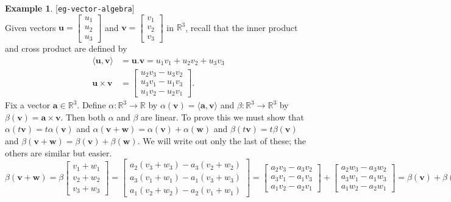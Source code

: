 \documentclass{amsart}
\newcommand{\lbl}[1]{\label{#1}\textup{[\texttt{#1}]}\ \\}
\newcommand{\lbl}{\label}
\newcommand{\R}         {{\mathbb{R}}}
\newcommand{\bsm}       {\left[\begin{smallmatrix}}
\newcommand{\esm}       {\end{smallmatrix}\right]}
\newcommand{\al}        {\alpha}
\newcommand{\bt}        {\beta}
\newcommand{\tm}        {\times}
\newcommand{\xra}       {\xrightarrow}
\newcommand{\ip}[1]     {\langle #1\rangle}
\newcommand{\va}        {\mathbf{a}}
\newcommand{\vu}        {\mathbf{u}}
\newcommand{\vv}        {\mathbf{v}}
\newcommand{\vw}        {\mathbf{w}}
\renewcommand{\:}       {\colon}
\theoremstyle{definition}
\newtheorem{example}[theorem]{Example}
\begin{document}
\begin{example}\lbl{eg-vector-algebra}
 Given vectors $\vu=\bsm u_1\\ u_2\\ u_3\esm$ and
 $\vv=\bsm v_1\\ v_2\\ v_3\esm$ in $\R^3$, recall that the
 inner product and cross product are defined by 
 \begin{align*}
  \ip{\vu,\vv} &= \vu . \vv = u_1v_1 + u_2v_2 + u_3v_3 \\
  \vu\tm\vv &= \bsm u_2 v_3 - u_3 v_2 \\
                    u_3 v_1 - u_1 v_3 \\
                    u_1 v_2 - u_2 v_1 \esm.
 \end{align*}
 Fix a vector $\va\in\R^3$.  Define $\al\:\R^3\xra{}\R$ by
 $\al(\vv)=\ip{\va,\vv}$ and $\bt\:\R^3\xra{}\R^3$ by
 $\bt(\vv)=\va\tm\vv$.  Then both $\al$ and $\bt$ are
 linear.  To prove this we must show that
 $\al(t\vv)=t\al(\vv)$ and $\al(\vv+\vw)=\al(\vv)+\al(\vw)$
 and $\bt(t\vv)=t\bt(\vv)$ and
 $\bt(\vv+\vw)=\bt(\vv)+\bt(\vw)$.  We will write out only
 the last of these; the others are similar but easier.
 \[ 
  \bt(\vv+\vw) = 
  \bt\bsm v_1+w_1 \\ v_2+w_2 \\ v_3+w_3 \esm = 
  \bsm a_2(v_3+w_3) - a_3(v_2+w_2) \\
       a_3(v_1+w_1) - a_1(v_3+w_3) \\
       a_1(v_2+w_2) - a_2(v_1+w_1) \esm = 
  \bsm a_2 v_3 - a_3 v_2 \\
       a_3 v_1 - a_1 v_3 \\
       a_1 v_2 - a_2 v_1 \esm +
  \bsm a_2 w_3 - a_3 w_2 \\
       a_3 w_1 - a_1 w_3 \\
       a_1 w_2 - a_2 w_1 \esm =
  \bt(\vv) + \bt(\vw).
 \]
\end{example}
\end{document}
